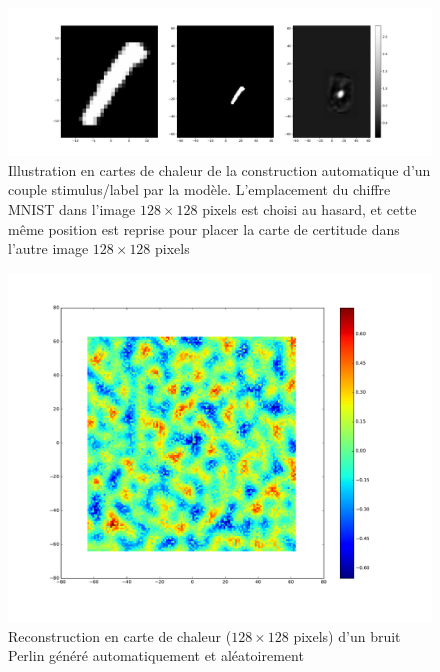 \begin{figure}[th]
\centering
\includegraphics[scale=0.4]{Figures/couples_a-v}
\decoRule
\caption[Figure]{Illustration en cartes de chaleur de la construction automatique d'un couple stimulus/label par la modèle. L'emplacement du chiffre MNIST dans l'image $128\times 128$ pixels est choisi au hasard, et cette même position est reprise pour placer la carte de certitude dans l'autre image $128\times 128$ pixels}
\label{fig:couples}
\end{figure}

\begin{figure}[th]
\centering
\includegraphics[scale=0.4]{Figures/perlin_noise}
\decoRule
\caption[Figure]{Reconstruction en carte de chaleur ($128\times 128$ pixels) d'un bruit Perlin généré automatiquement et aléatoirement \autocite{Perlin1985}}
\label{fig:perlin_noise}
\end{figure}

